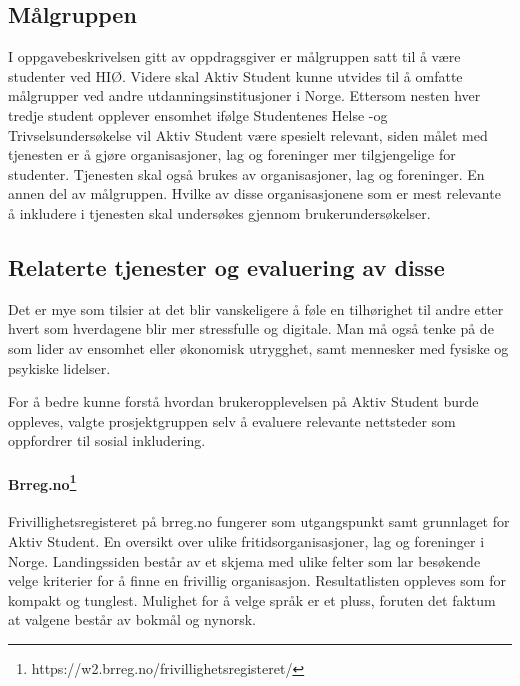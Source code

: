 \subsection{Målgruppen}
I oppgavebeskrivelsen gitt av oppdragsgiver er målgruppen satt til å være studenter ved HIØ. Videre skal Aktiv Student kunne utvides til å omfatte målgrupper ved andre utdanningsinstitusjoner i Norge. 
Ettersom nesten hver tredje student opplever ensomhet ifølge Studentenes Helse -og Trivselsundersøkelse \cite{SHOT:2} vil Aktiv Student være spesielt relevant, siden målet med tjenesten er å gjøre organisasjoner, lag og foreninger mer tilgjengelige for studenter. Tjenesten skal også brukes av organisasjoner, lag og foreninger. En annen del av målgruppen. Hvilke av disse organisasjonene som er mest relevante å inkludere i tjenesten skal undersøkes gjennom brukerundersøkelser.

\subsection{Relaterte tjenester og evaluering av disse}
\label{section:relaterte-tjenester}

Det er mye som tilsier at det blir vanskeligere å føle en tilhørighet til andre etter hvert som hverdagene blir mer stressfulle og digitale. Man må også tenke på de som lider av ensomhet eller økonomisk utrygghet, samt mennesker med fysiske og psykiske lidelser.


For å bedre kunne forstå hvordan brukeropplevelsen på Aktiv Student burde oppleves, valgte prosjektgruppen selv å evaluere relevante nettsteder som oppfordrer til sosial inkludering. 

\vspace{5mm} %

\paragraph{Brreg.no\footnote{https://w2.brreg.no/frivillighetsregisteret/}}
Frivillighetsregisteret på brreg.no fungerer som utgangspunkt samt grunnlaget for Aktiv Student. En oversikt over ulike fritidsorganisasjoner, lag og foreninger i Norge. Landingssiden består av et skjema med ulike felter som lar besøkende velge kriterier for å finne en frivillig organisasjon. Resultatlisten oppleves som for kompakt og tunglest. Mulighet for å velge språk er et pluss, foruten det faktum at valgene består av bokmål og nynorsk.

